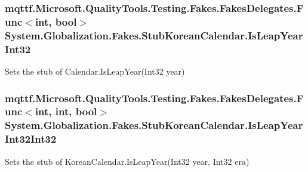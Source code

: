 \hypertarget{class_system_1_1_globalization_1_1_fakes_1_1_stub_korean_calendar_aaec9638e840f7c4b11abe087489f9d74}{
\subsubsection[{Is\-Leap\-Year\-Int32}]{\setlength{\rightskip}{0pt plus 5cm}mqttf.\-Microsoft.\-Quality\-Tools.\-Testing.\-Fakes.\-Fakes\-Delegates.\-Func$<$int, bool$>$ System.\-Globalization.\-Fakes.\-Stub\-Korean\-Calendar.\-Is\-Leap\-Year\-Int32}}\label{class_system_1_1_globalization_1_1_fakes_1_1_stub_korean_calendar_aaec9638e840f7c4b11abe087489f9d74}


Sets the stub of Calendar.\-Is\-Leap\-Year(\-Int32 year)

\hypertarget{class_system_1_1_globalization_1_1_fakes_1_1_stub_korean_calendar_aebeb0612379c99e601c9ad0baace6a8c}{
\subsubsection[{Is\-Leap\-Year\-Int32\-Int32}]{\setlength{\rightskip}{0pt plus 5cm}mqttf.\-Microsoft.\-Quality\-Tools.\-Testing.\-Fakes.\-Fakes\-Delegates.\-Func$<$int, int, bool$>$ System.\-Globalization.\-Fakes.\-Stub\-Korean\-Calendar.\-Is\-Leap\-Year\-Int32\-Int32}}\label{class_system_1_1_globalization_1_1_fakes_1_1_stub_korean_calendar_aebeb0612379c99e601c9ad0baace6a8c}


Sets the stub of Korean\-Calendar.\-Is\-Leap\-Year(\-Int32 year, Int32 era)

